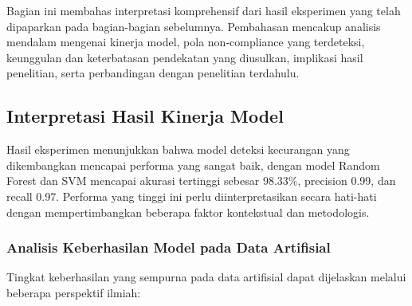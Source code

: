 Bagian ini membahas interpretasi komprehensif dari hasil eksperimen yang telah dipaparkan pada bagian-bagian sebelumnya. Pembahasan mencakup analisis mendalam mengenai kinerja model, pola non-compliance yang terdeteksi, keunggulan dan keterbatasan pendekatan yang diusulkan, implikasi hasil penelitian, serta perbandingan dengan penelitian terdahulu.

\subsection{Interpretasi Hasil Kinerja Model}
\label{subsec:interpretasiKinerjaModel}

Hasil eksperimen menunjukkan bahwa model deteksi kecurangan yang dikembangkan mencapai performa yang sangat baik, dengan model Random Forest dan SVM mencapai akurasi tertinggi sebesar 98.33\%, precision 0.99, dan recall 0.97. Performa yang tinggi ini perlu diinterpretasikan secara hati-hati dengan mempertimbangkan beberapa faktor kontekstual dan metodologis.

\subsubsection{Analisis Keberhasilan Model pada Data Artifisial}

Tingkat keberhasilan yang sempurna pada data artifisial dapat dijelaskan melalui beberapa perspektif ilmiah:

